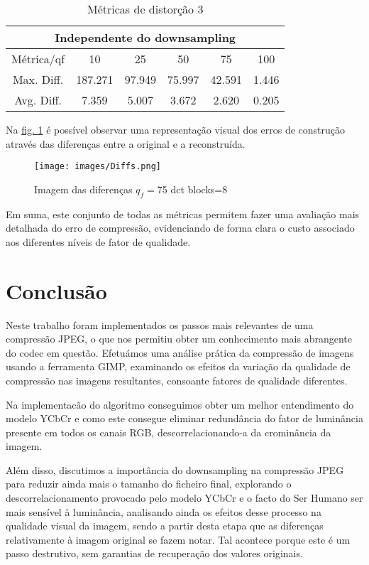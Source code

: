 \documentclass{article}
\begin{document}
\begin{table}[H]
    \centering
    \begin{tabular}{|c|c|c|c|c|c|}
        \hline
        \multicolumn{6}{|c|}{Independente do downsampling} \\
        \hline
        Métrica/qf & 10 & 25 & 50 & 75 & 100 \\
        \hline
        Max. Diff. & 187.271 & 97.949 & 75.997 & 42.591 & 1.446 \\
        \hline
        Avg. Diff. & 7.359 & 5.007 & 3.672 & 2.620 & 0.205 \\
        \hline
    \end{tabular}
    \caption{Métricas de distorção 3}
    \label{tab:tabela6}
\end{table}

Na \hyperref[fig:Diffs]{fig. \ref{fig:Diffs}} é possível observar uma representação visual dos erros de construção através das diferenças entre a original e a reconstruída.

\begin{figure}[H]
  \centering
  \texttt{[image: images/Diffs.png]}
  \caption{Imagem das diferenças $q_f=$75 dct blocks=8}
  \label{fig:Diffs}
\end{figure}

Em suma, este conjunto de todas as métricas permitem fazer uma avaliação mais detalhada do erro de compressão, evidenciando de forma clara o custo associado aos diferentes níveis de fator de qualidade.

\section{Conclusão}

Neste trabalho foram implementados os passos mais relevantes de uma compressão JPEG, o que nos permitiu obter um conhecimento mais abrangente do codec em questão. Efetuámos uma análise prática da compressão de imagens usando a ferramenta GIMP, examinando os efeitos da variação da qualidade de compressão nas imagens resultantes, consoante fatores de qualidade diferentes. 

Na implementacão do algoritmo conseguimos obter um melhor entendimento do modelo YCbCr e como este consegue eliminar redundância do fator de luminância presente em todos os canais RGB, descorrelacionando-a da crominância da imagem.

Além disso, discutimos a importância do downsampling na compressão JPEG para reduzir ainda mais o tamanho do ficheiro final, explorando o descorrelacionamento provocado pelo modelo YCbCr e o facto do Ser Humano ser mais sensível à luminância, analisando ainda os efeitos desse processo na qualidade visual da imagem, sendo a partir desta etapa que as diferenças relativamente à imagem original se fazem notar. Tal acontece porque este é um passo destrutivo, sem garantias de recuperação dos valores originais.
\end{document}
